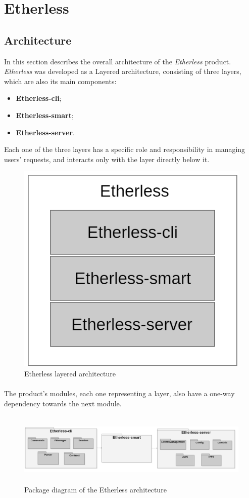 \section{Etherless}
	\subsection{Architecture} %
	In this section describes the overall architecture of the \textit{Etherless} product. \\
	\textit{Etherless} was developed as a Layered architecture, consisting of three layers, which are also its main components:
	\begin{itemize}
		\item \textbf{Etherless-cli};
		\item \textbf{Etherless-smart};
		\item \textbf{Etherless-server}.
	\end{itemize}
	Each one of the three layers has a specific role and responsibility in managing users' requests, and interacts only with the layer directly below it.
	\begin{figure} [h!]
		\centering
		\includegraphics[width=0.7\linewidth]{diagrammi/generali/LayeredArchitecture}
		\caption{Etherless layered architecture}
	\end{figure}
	\pagebreak
	\paragraph{} The product's modules, each one representing a layer, also have a one-way dependency towards the next module.
	\begin{figure} [h!]
		\centering
		\includegraphics[width=15cm, height=3.5cm]{diagrammi/generali/Etherless_package}
		\caption{Package diagram of the Etherless architecture}
	\end{figure}
